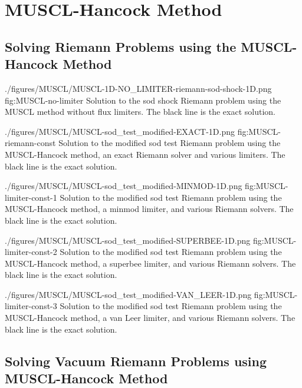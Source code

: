 \section{MUSCL-Hancock Method}




\subsection{Solving Riemann Problems using the MUSCL-Hancock Method}


\quickfigcap
	{./figures/MUSCL/MUSCL-1D-NO_LIMITER-riemann-sod-shock-1D.png}
	{fig:MUSCL-no-limiter}
	{
		Solution to the sod shock Riemann problem using the MUSCL method without flux limiters.
		The black line is the exact solution.
	}




\quickfigcap
	{./figures/MUSCL/MUSCL-sod_test_modified-EXACT-1D.png}
	{fig:MUSCL-riemann-const}
	{
		Solution to the modified sod test Riemann problem using the MUSCL-Hancock method, an exact Riemann solver and various limiters.
		The black line is the exact solution.
	}



\quickfigcap
	{./figures/MUSCL/MUSCL-sod_test_modified-MINMOD-1D.png}
	{fig:MUSCL-limiter-const-1}
	{
		Solution to the modified sod test Riemann problem using the MUSCL-Hancock method, a minmod limiter, and  various Riemann solvers.
		The black line is the exact solution.
	}

\quickfigcap
	{./figures/MUSCL/MUSCL-sod_test_modified-SUPERBEE-1D.png}
	{fig:MUSCL-limiter-const-2}
	{
		Solution to the modified sod test Riemann problem using the MUSCL-Hancock method, a superbee limiter, and  various Riemann solvers.
		The black line is the exact solution.
	}

\quickfigcap
	{./figures/MUSCL/MUSCL-sod_test_modified-VAN_LEER-1D.png}
	{fig:MUSCL-limiter-const-3}
	{
		Solution to the modified sod test Riemann problem using the MUSCL-Hancock method, a van Leer limiter, and various Riemann solvers.
		The black line is the exact solution.
	}






\subsection{Solving Vacuum Riemann Problems using MUSCL-Hancock Method}




